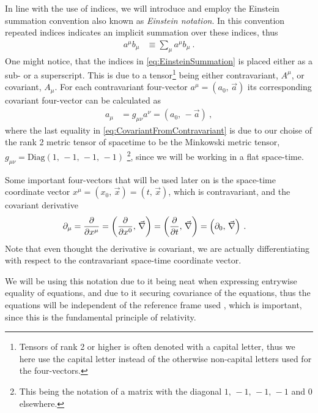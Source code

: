 \documentclass[../main.tex]{subfiles} %
\begin{document}
In line with the use of indices, we will introduce and employ the Einstein summation convention also known as \emph{Einstein notation}. In this convention repeated indices indicates an implicit summation over these indices, thus
\begin{align} \label{eq:EinsteinSummation}
    a^\mu b_\mu &\equiv \sum_\mu a^\mu b_\mu \: .
\end{align}
One might notice, that the indices in \cref{eq:EinsteinSummation} is placed either as a sub- or a superscript. This is due to a tensor\footnote{Tensors of rank 2 or higher is often denoted with a capital letter, thus we here use the capital letter instead of the otherwise non-capital letters used for the four-vectors.} being either contravariant, $A^\mu$, or covariant, $A_\mu$. For each contravariant four-vector $a^\mu = (a_0,\, \Vec{a})$ its corresponding covariant four-vector can be calculated as
\begin{align} \label{eq:CovariantFromContravariant}
    a_\mu &= g_{\mu\nu}a^\nu = (a_0,\, -\Vec{a}) \: ,
\end{align}
where the last equality in \cref{eq:CovariantFromContravariant} is due to our choise of the rank 2 metric tensor of spacetime to be the Minkowski metric tensor, $g_{\mu\nu} = \text{Diag}(1,\, -1,\, -1,\, -1)$ \footnote{This being the notation of a matrix with the diagonal $1,\, -1,\, -1,\, -1$ and $0$ elsewhere.}, since we will be working in a flat space-time.

Some important four-vectors that will be used later on is the space-time coordinate vector $x^\mu = (x_0,\, \Vec{x}) = (t,\, \Vec{x})$, which is contravariant, and the covariant derivative
\begin{align}
    \partial_\mu &= \pdv{}{x^\mu} = \left(\pdv{}{x^0},\, \Vec{\nabla}\right) = \left(\pdv{}{t},\, \Vec{\nabla}\right) = \left(\partial_0,\, \Vec{\nabla}\right)  \: .
\end{align}
Note that even thought the derivative is covariant, we are actually differentiating with respect to the contravariant space-time coordinate vector.

We will be using this notation due to it being neat when expressing entrywise equality of equations, and due to it securing covariance of the equations, thus the equations will be independent of the reference frame used \cite{Uggerhoej_SpecielRelativitetsteori_2016}, which is important, since this is the fundamental principle of relativity.
\end{document}
